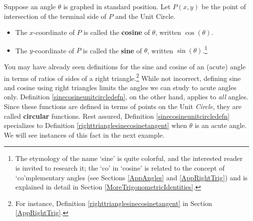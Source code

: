  \smallskip
 
 \colorbox{ResultColor}{\bbm

\begin{defn} \label{sinecosineunitcircledefn}  Suppose an angle $\theta$ is graphed in standard position. Let $P(x,y)$ be the point of intersection of the terminal side of $P$ and the Unit Circle.  

\begin{itemize}

\item The $x$-coordinate of $P$ is called the  \textbf{cosine} of $\theta$, written $\cos(\theta)$.

\item The $y$-coordinate of $P$ is called the  \textbf{sine} of $\theta$, written $\sin(\theta)$.\footnote{The etymology of the name `sine' is quite colorful, and the interested reader is invited to research it;  the `co' in `cosine' is related to the concept of `co'mplementary angles (see Sections \ref{AppAngles} and \ref{AppRightTrig}) and is explained in detail in Section \ref{MoreTrigonometricIdentities}.} 

\end{itemize}

\end{defn}

\ebm} 
 
 
\smallskip

You may have already seen definitions for the sine and cosine of an (acute) angle  in terms of ratios of sides of a right triangle.\footnote{For instance, Definition \ref{righttrianglesinecosinetangent} in Section \ref{AppRightTrig}.}  While not incorrect, defining sine and cosine using right triangles limits the angles we can study to acute angles only.  Definition \ref{sinecosineunitcircledefn}, on the other hand, applies to \textit{all} angles. Since these functions are defined in terms of points on the Unit \textit{Circle}, they are called  \textbf{circular} functions.  Rest assured,  Definition \ref{sinecosineunitcircledefn} specializes to Definition \ref{righttrianglesinecosinetangent} when $\theta$ is an acute angle.  We will see instances of this fact in the next example.


